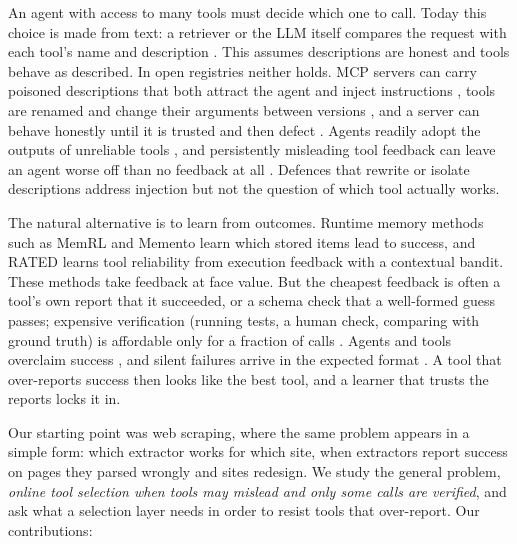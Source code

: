 \documentclass[11pt]{article}
\begin{document}
An agent with access to many tools must decide which one to call. Today this choice is made from
text: a retriever or the LLM itself compares the request with each tool's name and description
\citep{toolret,autotool}. This assumes descriptions are honest and tools behave as described. In
open registries neither holds. MCP servers can carry poisoned descriptions that both attract the
agent and inject instructions \citep{mcptox,mcpthreat}, tools are renamed and change their
arguments between versions \citep{mcpevol,toolevo}, and a server can behave honestly until it is
trusted and then defect \citep{trustshift}. Agents readily adopt the outputs of unreliable tools
\citep{overreliance}, and persistently misleading tool feedback can leave an agent worse off than
no feedback at all \citep{blindtrust}. Defences that rewrite or isolate descriptions
\citep{toolguard,trustdesc} address injection but not the question of which tool actually works.

The natural alternative is to learn from outcomes. Runtime memory methods such as MemRL
\citep{memrl} and Memento \citep{memento} learn which stored items lead to success, and RATED
\citep{rated} learns tool reliability from execution feedback with a contextual bandit. These
methods take feedback at face value. But the cheapest feedback is often a tool's own report
that it succeeded, or a schema check that a well-formed guess passes; expensive verification
(running tests, a human check, comparing with ground truth) is affordable only for a fraction of
calls \citep{selfreports,auditbudget}. Agents and tools overclaim success \citep{overclaim}, and
silent failures arrive in the expected format \citep{outcomemon}. A tool that over-reports
success then looks like the best tool, and a learner that trusts the reports locks it in.

Our starting point was web scraping, where the same problem appears in a simple form: which
extractor works for which site, when extractors report success on pages they parsed wrongly and
sites redesign. We study the general problem, \emph{online tool selection when tools may
mislead and only some calls are verified}, and ask what a selection layer needs in order to resist
tools that over-report. Our contributions:
\end{document}
